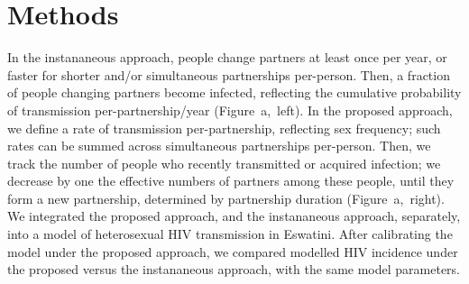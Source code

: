 \section{Methods}
In the instananeous approach, people change partners at least once per year,
or faster for shorter and/or simultaneous partnerships per-person.
Then, a fraction of people changing partners become infected,
reflecting the cumulative probability of transmission per-partnership/year (Figure~a,~left).
In the proposed approach, we define a rate of transmission per-partnership, reflecting sex frequency;
such rates can be summed across simultaneous partnerships per-person.
Then, we track the number of people who recently transmitted or acquired infection;
we decrease by one the effective numbers of partners among these people,
until they form a new partnership, determined by partnership duration (Figure~a,~right).
We integrated the proposed approach, and the instananeous approach, separately,
into a model of heterosexual HIV transmission in Eswatini.
After calibrating the model under the proposed approach,
we compared modelled HIV incidence under the proposed versus the instananeous approach,
with the same model parameters.
